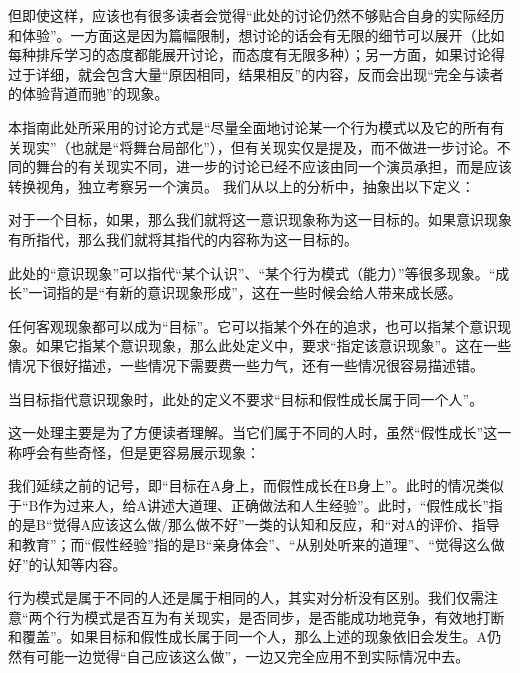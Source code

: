 但即使这样，应该也有很多读者会觉得“此处的讨论仍然不够贴合自身的实际经历和体验”。一方面这是因为篇幅限制，想讨论的话会有无限的细节可以展开（比如每种排斥学习的态度都能展开讨论，而态度有无限多种）；另一方面，如果讨论得过于详细，就会包含大量“原因相同，结果相反”的内容，反而会出现“完全与读者的体验背道而驰”的现象。

本指南此处所采用的讨论方式是“尽量全面地讨论某一个行为模式以及它的所有有关现实”（也就是“将舞台局部化”），但有关现实仅是提及，而不做进一步讨论。不同的舞台的有关现实不同，进一步的讨论已经不应该由同一个演员承担，而是应该转换视角，独立考察另一个演员。
\divider
我们从以上的分析中，抽象出以下定义：

对于一个目标，如果，那么我们就将这一意识现象称为这一目标的。如果意识现象有所指代，那么我们就将其指代的内容称为这一目标的。
\begin{explain}
此处的“意识现象”可以指代“某个认识”、“某个行为模式（能力）”等很多现象。“成长”一词指的是“有新的意识现象形成”，这在一些时候会给人带来成长感。

任何客观现象都可以成为“目标”。它可以指某个外在的追求，也可以指某个意识现象。如果它指某个意识现象，那么此处定义中，要求“指定该意识现象”。这在一些情况下很好描述，一些情况下需要费一些力气，还有一些情况很容易描述错。
\insertparanotes
\end{explain}
当目标指代意识现象时，此处的定义不要求“目标和假性成长属于同一个人”。
\begin{explain}
这一处理主要是为了方便读者理解。当它们属于不同的人时，虽然“假性成长”这一称呼会有些奇怪，但是更容易展示现象：

我们延续之前的记号，即“目标在A身上，而假性成长在B身上”。此时的情况类似于“B作为过来人，给A讲述大道理、正确做法和人生经验”。此时，“假性成长”指的是B“觉得A应该这么做/那么做不好”一类的认知和反应，和“对A的评价、指导和教育”；而“假性经验”指的是B“亲身体会”、“从别处听来的道理”、“觉得这么做好”的认知等内容。

行为模式是属于不同的人还是属于相同的人，其实对分析没有区别。我们仅需注意“两个行为模式是否互为有关现实，是否同步，是否能成功地竞争，有效地打断和覆盖”。如果目标和假性成长属于同一个人，那么上述的现象依旧会发生。A仍然有可能一边觉得“自己应该这么做”，一边又完全应用不到实际情况中去。
\end{explain}
